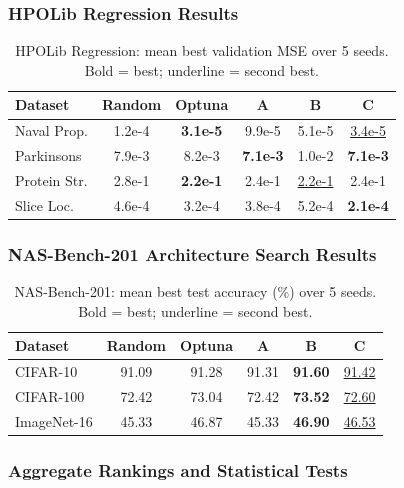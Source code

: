 \documentclass[11pt]{article}
\theoremstyle{definition}
\begin{document}
\subsubsection{HPOLib Regression Results}

\begin{table}[H]
\centering
\caption{HPOLib Regression: mean best validation MSE over 5 seeds.
         Bold = best; underline = second best.}
\label{tab:hpolib_reg}
\renewcommand{\arraystretch}{1.15}
\begin{tabular}{lccccc}
\toprule
\textbf{Dataset} & \textbf{Random} & \textbf{Optuna} & \textbf{A} & \textbf{B} & \textbf{C} \\
\midrule
Naval Prop.     & 1.2e-4 & \textbf{3.1e-5} & 9.9e-5 & 5.1e-5 & \underline{3.4e-5} \\
Parkinsons      & 7.9e-3 & 8.2e-3 & \textbf{7.1e-3} & 1.0e-2 & \textbf{7.1e-3} \\
Protein Str.    & 2.8e-1 & \textbf{2.2e-1} & 2.4e-1 & \underline{2.2e-1} & 2.4e-1 \\
Slice Loc.      & 4.6e-4 & 3.2e-4 & 3.8e-4 & 5.2e-4 & \textbf{2.1e-4} \\
\bottomrule
\end{tabular}
\end{table}

\subsubsection{NAS-Bench-201 Architecture Search Results}

\begin{table}[H]
\centering
\caption{NAS-Bench-201: mean best test accuracy (\%) over 5 seeds.
         Bold = best; underline = second best.}
\label{tab:nasbench_results}
\renewcommand{\arraystretch}{1.15}
\begin{tabular}{lccccc}
\toprule
\textbf{Dataset} & \textbf{Random} & \textbf{Optuna} & \textbf{A} & \textbf{B} & \textbf{C} \\
\midrule
CIFAR-10       & 91.09 & 91.28 & 91.31 & \textbf{91.60} & \underline{91.42} \\
CIFAR-100      & 72.42 & 73.04 & 72.42 & \textbf{73.52} & \underline{72.60} \\
ImageNet-16    & 45.33 & 46.87 & 45.33 & \textbf{46.90} & \underline{46.53} \\
\bottomrule
\end{tabular}
\end{table}

\subsubsection{Aggregate Rankings and Statistical Tests}
\end{document}

